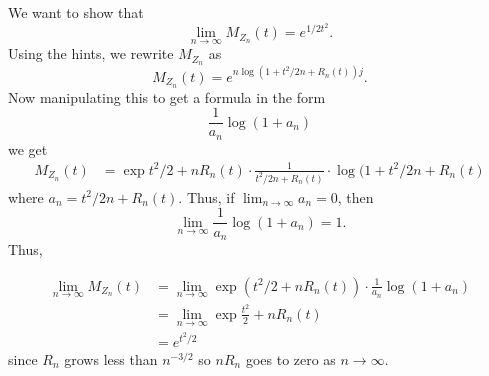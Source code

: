 
We want to show that 
\[
    \lim_{n \to \infty} M_{Z_{n} } (t) = e^{1/2 t^2 } 
.\] 
Using the hints, we rewrite $ M_{Z_{n} } $  as
\[
    M_{Z_{n} } (t) = e^{n \log (1+ t^2/2n + R_{n} (t))j} 
.\] 
Now manipulating this to get a formula in the form
\[
    \frac{1}{a_{n} } \log(1+ a_n) 
\] 
we get 
\begin{align*}
    M_{Z_{n} } (t) &= \exp{ t^2/2 + n R_{n} (t) \cdot \frac{1}{t^2/2n +  R_{n} (t)} \cdot
    \log(1+t^2/2n + R_{n} (t) }
\end{align*}
where $ a_{n} = t^2/2n + R_{n} (t)$. Thus, if $ \lim_{n\to \infty} a_{n} = 0  $, then 
\[
    \lim_{n \to \infty} \frac{1}{a_{n} } \log(1+a_{n} ) =1
.\] 
Thus, 

\begin{align*}
    \lim_{n\to \infty} M_{Z_{n} } (t) &= \lim_{n \to \infty} \exp{ (t^2/2 + n R_{n} (t)) \cdot
    \frac{1}{a_{n} } \log(1+a_{n} ) }\\
				      &= \lim_{n \to \infty} \exp{ \frac{t^2}{2}  + n R_{n} (t)}\\
				      &= e^{t^2/2} 
\end{align*}
since $ R_{n} $ grows less than $ n^{-3/2} $ so $ n R_{n} $ goes to zero as $ n \to \infty$.

